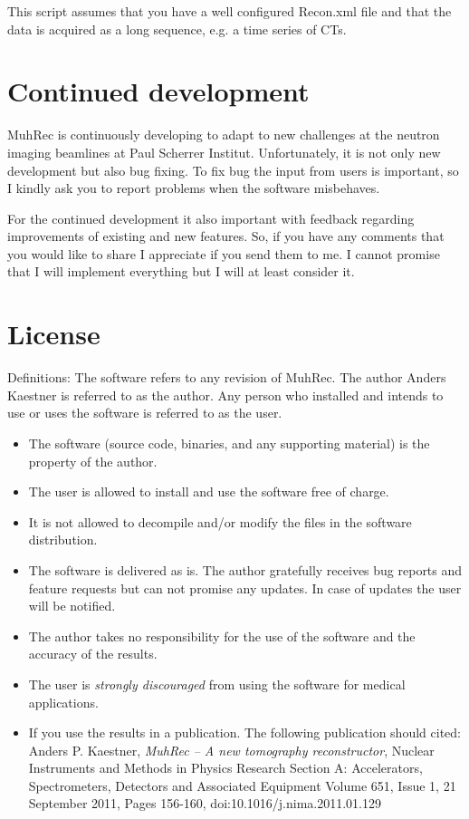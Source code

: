 \documentclass[a4paper]{scrreprt}
\begin{document}
This script assumes that you have a well configured Recon.xml file and that the data is acquired as a long sequence, e.g. a time series of CTs.

\chapter{Continued development}
MuhRec is continuously developing to adapt to new challenges at the neutron
imaging beamlines at Paul Scherrer Institut. Unfortunately, it is not only new
development but also bug fixing. To fix bug the input from users is important,
so I kindly ask you to report problems when the software misbehaves.

For the continued development it also important with feedback regarding
improvements of existing and new features. So, if you have any comments that you
would like to share I appreciate if you send them to me. I cannot promise that I
will implement everything but I will at least consider it.



\appendix
\chapter{License}
Definitions: The software refers to any revision of MuhRec. The author Anders
Kaestner is referred to as the author. Any person who installed and intends to
use or uses the software is referred to as the user.
\begin{itemize}
\item The software (source code, binaries, and any supporting material) is the property of the author.
\item The user is allowed to install and use the software free of charge.
\item It is not allowed to decompile and/or modify the files in the software distribution.
\item The software is delivered as is. The author gratefully receives bug
reports and feature requests but can not promise any updates. In case of updates
the user will be notified.
\item The author takes no responsibility for the use of the software and the
accuracy of the results.
\item The user is \emph{strongly discouraged} from using the software for
medical applications.
\item If you use the results in a publication. The following publication should
cited: Anders P. Kaestner, \emph{MuhRec -- A new tomography reconstructor},
Nuclear Instruments and Methods in Physics Research Section A:
Accelerators, Spectrometers, Detectors and Associated Equipment
Volume 651, Issue 1, 21 September 2011, Pages 156-160,
doi:10.1016/j.nima.2011.01.129

\end{itemize}
\end{document}
